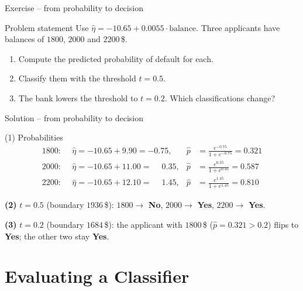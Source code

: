 \documentclass[aspectratio=169,11pt]{beamer}
\begin{document}
\begin{frame}{Exercise -- from probability to decision}
  \begin{block}{Problem statement}
    Use $\hat\eta=-10.65+0.0055\cdot\text{balance}$. Three applicants have
    balances of $1800$, $2000$ and $2200$\,\$.
    \begin{enumerate}
      \item Compute the predicted probability of default for each.
      \item Classify them with the threshold $t=0.5$.
      \item The bank lowers the threshold to $t=0.2$. Which classifications
            change?
    \end{enumerate}
  \end{block}
\end{frame}

\begin{frame}{Solution -- from probability to decision}
  \begin{exampleblock}{(1) Probabilities}
    \begin{align*}
      1800\colon&\ \ \hat\eta=-10.65+9.90=-0.75, & \hat p&=\tfrac{e^{-0.75}}{1+e^{-0.75}}=0.321\\
      2000\colon&\ \ \hat\eta=-10.65+11.00=\phantom{-}0.35, & \hat p&=\tfrac{e^{0.35}}{1+e^{0.35}}=0.587\\
      2200\colon&\ \ \hat\eta=-10.65+12.10=\phantom{-}1.45, & \hat p&=\tfrac{e^{1.45}}{1+e^{1.45}}=0.810
    \end{align*}
  \end{exampleblock}
  \textbf{(2)} $t=0.5$ (boundary $1936$\,\$): $1800\to$ \textbf{No},
  $2000\to$ \textbf{Yes}, $2200\to$ \textbf{Yes}.

  \medskip
  \textbf{(3)} $t=0.2$ (boundary $1684$\,\$): the applicant with $1800$\,\$
  ($\hat p=0.321>0.2$) flips to \textbf{Yes}; the other two stay
  \textbf{Yes}.

  \medskip
\end{frame}

\section[Evaluation]{Evaluating a Classifier}
\end{document}
